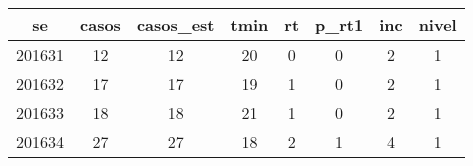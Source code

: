 \begin{tabular}{c|ccccccc}
  \hline
se & casos & casos\_est & tmin & rt & p\_rt1 & inc & nivel \\ 
  \hline
201631 & 12 & 12 & 20 & 0 & 0 & 2 & 1 \\ 
  201632 & 17 & 17 & 19 & 1 & 0 & 2 & 1 \\ 
  201633 & 18 & 18 & 21 & 1 & 0 & 2 & 1 \\ 
  201634 & 27 & 27 & 18 & 2 & 1 & 4 & 1 \\ 
   \hline
\end{tabular}
